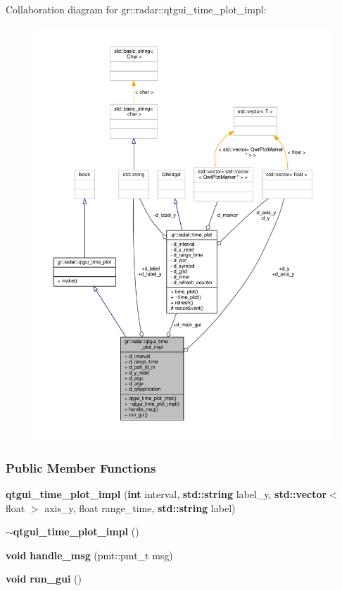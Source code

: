 Collaboration diagram for gr\+:\+:radar\+:\+:qtgui\+\_\+time\+\_\+plot\+\_\+impl\+:
\nopagebreak
\begin{figure}[H]
\begin{center}
\leavevmode
\includegraphics[width=350pt]{db/d70/classgr_1_1radar_1_1qtgui__time__plot__impl__coll__graph}
\end{center}
\end{figure}
\subsubsection*{Public Member Functions}
\begin{DoxyCompactItemize}
\item 
{\bf qtgui\+\_\+time\+\_\+plot\+\_\+impl} ({\bf int} interval, {\bf std\+::string} label\+\_\+y, {\bf std\+::vector}$<$ float $>$ axis\+\_\+y, float range\+\_\+time, {\bf std\+::string} label)
\item 
{\bf $\sim$qtgui\+\_\+time\+\_\+plot\+\_\+impl} ()
\item 
{\bf void} {\bf handle\+\_\+msg} (pmt\+::pmt\+\_\+t msg)
\item 
{\bf void} {\bf run\+\_\+gui} ()
\end{DoxyCompactItemize}

